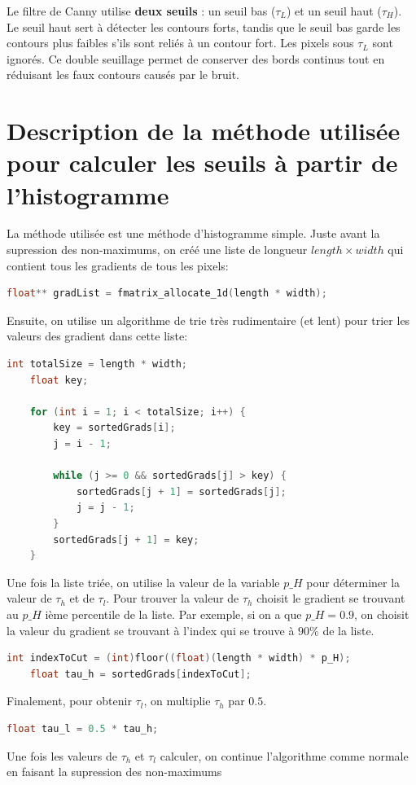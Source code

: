 \documentclass{article}
\begin{document}
Le filtre de Canny utilise \textbf{deux seuils} : un seuil bas (\(\tau_L\)) et un seuil haut (\(\tau_H\)).  
Le seuil haut sert à détecter les contours forts, tandis que le seuil bas garde les contours plus faibles s’ils sont reliés à un contour fort.  
Les pixels sous \(\tau_L\) sont ignorés.  
Ce double seuillage permet de conserver des bords continus tout en réduisant les faux contours causés par le bruit.

\section{Description de la méthode utilisée pour calculer les seuils à partir de l'histogramme}
La méthode utilisée est une méthode d'histogramme simple. Juste avant la supression des non-maximums, on créé une liste de longueur $length \times width$ qui contient tous
les gradients de tous les pixels:
\begin{lstlisting}[language=c]
    float** gradList = fmatrix_allocate_1d(length * width);
\end{lstlisting}
Ensuite, on utilise un algorithme de trie très rudimentaire (et lent) pour trier les valeurs des gradient dans cette liste:
\begin{lstlisting}[language=C]
    int totalSize = length * width;
    float key;

    for (int i = 1; i < totalSize; i++) {
        key = sortedGrads[i]; 
        j = i - 1;

        while (j >= 0 && sortedGrads[j] > key) {
            sortedGrads[j + 1] = sortedGrads[j];
            j = j - 1;
        }
        sortedGrads[j + 1] = key; 
    }
\end{lstlisting}
Une fois la liste triée, on utilise la valeur de la variable $p\_H$ pour déterminer la valeur de $\tau_h$ et de $\tau_l$. Pour trouver la valeur de $\tau_h$ 
choisit le gradient se trouvant au $p\_H$ ième percentile de la liste. Par exemple, si on a que $p\_H = 0.9$, on choisit la valeur du gradient se trouvant à 
l'index qui se trouve à $90\%$ de la liste.
\begin{lstlisting}[language=C]
    int indexToCut = (int)floor((float)(length * width) * p_H);
    float tau_h = sortedGrads[indexToCut];
\end{lstlisting}
Finalement, pour obtenir $\tau_l$, on multiplie $\tau_h$ par $0.5$.
\begin{lstlisting}[language=C]
    float tau_l = 0.5 * tau_h;
\end{lstlisting}
Une fois les valeurs de $\tau_h$ et $\tau_l$ calculer, on continue l'algorithme comme normale en faisant la supression des non-maximums
\end{document}

